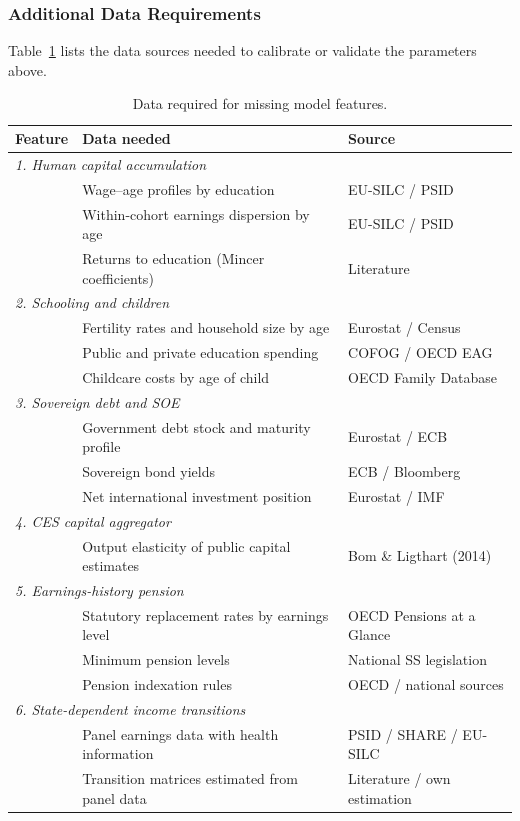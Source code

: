 \subsubsection{Additional Data Requirements}

Table~\ref{tab:future-data} lists the data sources needed to calibrate or validate the parameters above.

\begin{table}[H]
\centering
\small
\caption{Data required for missing model features.}
\label{tab:future-data}
\begin{tabular}{lll}
\toprule
Feature & Data needed & Source \\
\midrule
\multicolumn{3}{l}{\textit{1. Human capital accumulation}} \\
& Wage--age profiles by education & EU-SILC / PSID \\
& Within-cohort earnings dispersion by age & EU-SILC / PSID \\
& Returns to education (Mincer coefficients) & Literature \\
\midrule
\multicolumn{3}{l}{\textit{2. Schooling and children}} \\
& Fertility rates and household size by age & Eurostat / Census \\
& Public and private education spending & COFOG / OECD EAG \\
& Childcare costs by age of child & OECD Family Database \\
\midrule
\multicolumn{3}{l}{\textit{3. Sovereign debt and SOE}} \\
& Government debt stock and maturity profile & Eurostat / ECB \\
& Sovereign bond yields & ECB / Bloomberg \\
& Net international investment position & Eurostat / IMF \\
\midrule
\multicolumn{3}{l}{\textit{4. CES capital aggregator}} \\
& Output elasticity of public capital estimates & Bom \& Ligthart (2014) \\
\midrule
\multicolumn{3}{l}{\textit{5. Earnings-history pension}} \\
& Statutory replacement rates by earnings level & OECD Pensions at a Glance \\
& Minimum pension levels & National SS legislation \\
& Pension indexation rules & OECD / national sources \\
\midrule
\multicolumn{3}{l}{\textit{6. State-dependent income transitions}} \\
& Panel earnings data with health information & PSID / SHARE / EU-SILC \\
& Transition matrices estimated from panel data & Literature / own estimation \\
\bottomrule
\end{tabular}
\end{table}
